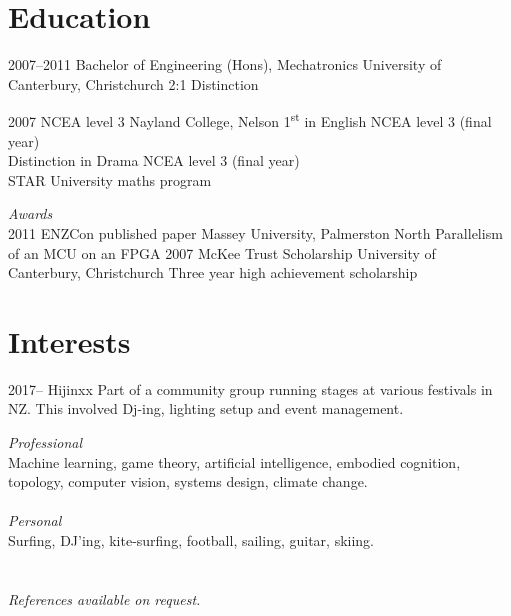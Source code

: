 \documentclass[print]{friggeri-cv} %
\begin{document}
\section{Education}
\begin{entrylist}
\entry
{2007--2011}
{Bachelor of Engineering (Hons), Mechatronics}
{University of Canterbury, Christchurch}
{2:1 Distinction}

\entry
{2007}
{NCEA level 3}
{Nayland College, Nelson}
{1\textsuperscript{st} in English NCEA level 3 (final year)\\
Distinction in Drama NCEA level 3 (final year)\\
STAR University maths program}

\emph{Awards}\\
\entry
{2011}
{ENZCon published paper}
{Massey University, Palmerston North}
{Parallelism of an MCU on an FPGA}
\entry
{2007}
{McKee Trust Scholarship}
{University of Canterbury, Christchurch}
{Three year high achievement scholarship}
\end{entrylist}

\section{Interests}
\begin{entrylist}
\entry 
{2017--}
{Hijinxx}
{}
{Part of a community group running stages at various festivals in NZ. This involved Dj-ing, lighting setup and event management.}
\end{entrylist}

\emph{Professional}\\ Machine learning, game theory, artificial intelligence, embodied cognition, topology, computer vision, systems design, climate change.\\
\\
\emph{Personal}\\ Surfing, DJ'ing, kite-surfing, football, sailing, guitar, skiing.
\\ \\ \\
\emph{References available on request.}
\end{document}
